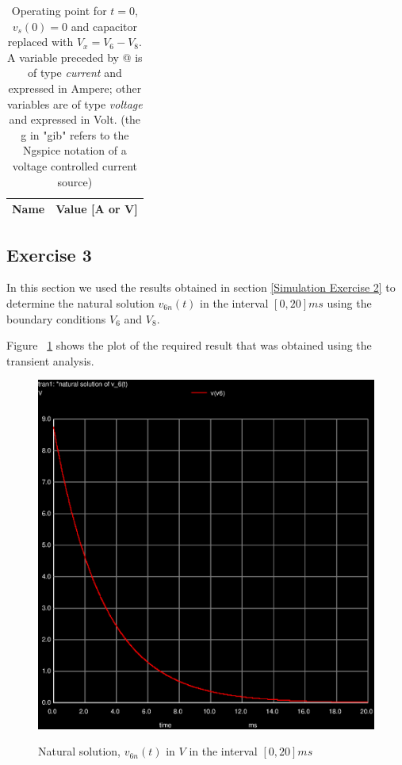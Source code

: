 \begin{table}[!ht]
  \centering
  \caption{Operating point for $t = 0$, $v_s(0) = 0$ and capacitor replaced with $V_x = V_6 - V_8$. A variable preceded by @ is of type {\em current}
    and expressed in Ampere; other variables are of type {\it voltage} and expressed in
    Volt. (the g in "gib" refers to the Ngspice notation of a voltage controlled current source)}
  \begin{tabular}{|l|r|}
    \hline    
    {\bf Name} & {\bf Value [A or V]} \\ \hline
    
  \end{tabular}
  \label{tab:op2}
\end{table}

\subsection{Exercise 3}
\label{Simulation Exercise 3}
In this section we used the results obtained in section \ref{Simulation Exercise 2} to determine the natural solution $v_{6n}(t)$ in the interval $[0,20]ms$ using the boundary conditions $V_6$ and $V_8$.

Figure ~\ref{fig:simulation_3} shows the plot of the required result that was obtained using the transient analysis.

\begin{figure}[!ht] \centering
\caption{Natural solution, $v_{6n}(t)$ in $V$ in the interval $[0,20]ms$}
\includegraphics[width=0.8\linewidth]{trans3.eps}
\label{fig:simulation_3}
\end{figure}

